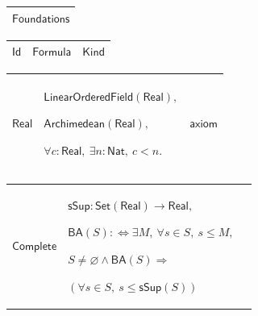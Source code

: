\documentclass[11pt]{amsart}
\renewcommand{\arraystretch}{1.4}
\newlength{\FTCOneColumnBody}
\newlength{\FTCThreeColumnBody}
\begin{document}
{\centering
\renewcommand{\arraystretch}{1.4}
\par\setlength{\parskip}{0pt}\nointerlineskip
\noindent
\begin{tabular}{|@{}>{\centering\arraybackslash}m{\FTCOneColumnBody}|}\hline
$\displaystyle \textsf{Foundations}$\\ \hline
\end{tabular}%
\par\setlength{\parskip}{0pt}\nointerlineskip
\noindent
\begin{tabular}{|@{}>{\centering\arraybackslash}m{0.251968\FTCThreeColumnBody}|>{\centering\arraybackslash}m{0.590551\FTCThreeColumnBody}|>{\centering\arraybackslash}m{0.157480\FTCThreeColumnBody}|}\hline
$\displaystyle \textsf{Id}$ & $\displaystyle \textsf{Formula}$ & $\displaystyle \textsf{Kind}$\\ \hline
\end{tabular}%
\par\setlength{\parskip}{0pt}\nointerlineskip
\noindent
\begin{tabular}{|@{}>{\centering\arraybackslash}m{0.251968\FTCThreeColumnBody}|>{\centering\arraybackslash}m{0.590551\FTCThreeColumnBody}|>{\centering\arraybackslash}m{0.157480\FTCThreeColumnBody}|}\hline
\hypertarget{ax:Real}{$\displaystyle \textsf{Real}$} & $\displaystyle \textsf{LinearOrderedField}(\textsf{Real}),$\par
$\displaystyle \textsf{Archimedean}(\textsf{Real}),$\par
$\displaystyle \forall c:\textsf{Real},\ \exists n:\textsf{Nat},\ c<n.$ & $\displaystyle \textsf{axiom}$\\ \hline
\end{tabular}%
\par\setlength{\parskip}{0pt}\nointerlineskip
\noindent
\begin{tabular}{|@{}>{\centering\arraybackslash}m{0.251968\FTCThreeColumnBody}|>{\centering\arraybackslash}m{0.590551\FTCThreeColumnBody}|>{\centering\arraybackslash}m{0.157480\FTCThreeColumnBody}|}\hline
\hypertarget{ax:Complete}{$\displaystyle \textsf{Complete}$} & $\displaystyle \textsf{sSup}:\textsf{Set}(\textsf{Real})\to\textsf{Real},$\par
$\displaystyle \textsf{BA}(S):\Longleftrightarrow\exists M,\ \forall s\in S,\ s\le M,$\par
$\displaystyle S\ne\varnothing\land\textsf{BA}(S)\Rightarrow$\par
$\displaystyle (\forall s\in S,\ s\le\textsf{sSup}(S))$\par

\end{tabular}}
\end{document}
